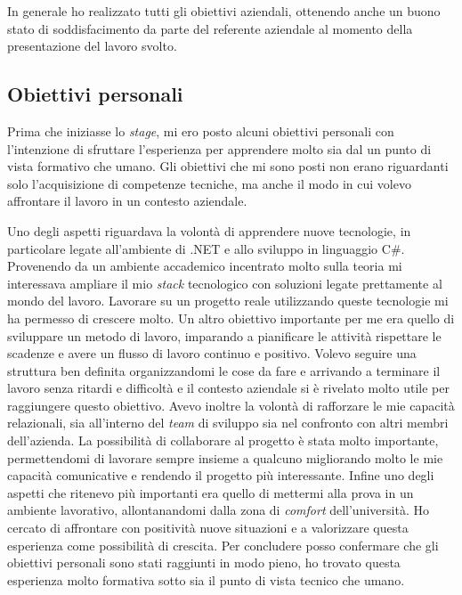 In generale ho realizzato tutti gli obiettivi aziendali, ottenendo anche un buono stato di soddisfacimento da parte del referente aziendale al momento della presentazione del lavoro svolto.

\subsection{Obiettivi  personali}
Prima che iniziasse lo \textit{stage}, mi ero posto alcuni obiettivi personali con l'intenzione di sfruttare l'esperienza per apprendere molto sia dal un punto di vista formativo che umano.
Gli obiettivi che mi sono posti non erano riguardanti solo l'acquisizione di competenze tecniche, ma anche il modo in cui volevo affrontare il lavoro in un contesto aziendale.

Uno degli aspetti riguardava la volontà di apprendere nuove tecnologie, in particolare legate all'ambiente di .NET e allo sviluppo in linguaggio C\#. Provenendo da un ambiente accademico incentrato molto sulla teoria mi interessava  ampliare il mio \textit{stack} tecnologico con soluzioni legate prettamente al mondo del lavoro. Lavorare su un progetto reale utilizzando queste tecnologie mi ha permesso di crescere molto.
Un altro obiettivo importante per me era quello di sviluppare un metodo di lavoro, imparando a pianificare le attività rispettare le scadenze e avere un flusso di lavoro continuo e positivo. Volevo seguire una struttura ben definita organizzandomi le cose da fare e arrivando a terminare il lavoro senza ritardi e difficoltà e il contesto aziendale si è rivelato molto utile per raggiungere questo obiettivo.
Avevo inoltre la volontà di rafforzare le mie capacità relazionali, sia all'interno del \textit{team} di sviluppo sia nel confronto con altri membri dell'azienda. La possibilità di collaborare al progetto è stata molto importante, permettendomi di lavorare sempre insieme a qualcuno migliorando molto le mie capacità comunicative e rendendo il progetto più interessante.
Infine uno degli aspetti che ritenevo più importanti era quello di mettermi alla prova in un ambiente lavorativo, allontanandomi dalla zona di \textit{comfort} dell'università. Ho cercato di affrontare con positività nuove situazioni e a valorizzare questa esperienza come possibilità di crescita.
Per concludere posso confermare che gli obiettivi personali sono stati raggiunti in modo pieno, ho trovato questa esperienza molto formativa sotto sia il punto di vista tecnico che umano.



